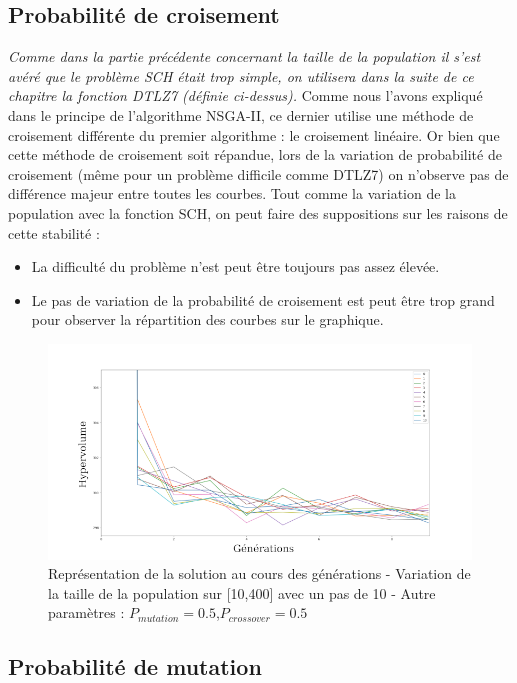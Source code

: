 \documentclass[12pt]{report}
\begin{document}
      \subsection{Probabilité de croisement}
      \emph{Comme dans la partie précédente concernant la taille de la population il s'est avéré que le problème SCH était trop simple, on utilisera dans la suite de ce chapitre la fonction DTLZ7 (définie ci-dessus).}
      Comme nous l'avons expliqué dans le principe de l'algorithme NSGA-II, ce dernier utilise une méthode de croisement différente du premier algorithme : le croisement linéaire.
      Or bien que cette méthode de croisement soit répandue, lors de la variation de probabilité de croisement (même pour un problème difficile comme DTLZ7) on n'observe pas de différence majeur entre toutes les courbes. Tout comme la variation de la population avec la fonction SCH, on peut faire des suppositions sur les raisons de cette stabilité :
      \begin{itemize}
        \item La difficulté du problème n'est peut être toujours pas assez élevée.
        \item Le pas de variation de la probabilité de croisement est peut être trop grand pour observer la répartition des courbes sur le graphique.
      \end{itemize}

      \begin{figure}[h]
        \centering
        \includegraphics[width=15cm]{img/DTLZ7_crossover.png}
        \caption{Représentation de la solution au cours des générations - Variation de la taille de la population sur [10,400] avec un pas de 10 - Autre paramètres : $P_{mutation} = 0.5$,$P_{crossover} = 0.5$}
        \label{sch_crossover_moy}
      \end{figure}

      \subsection{Probabilité de mutation}
\end{document}

